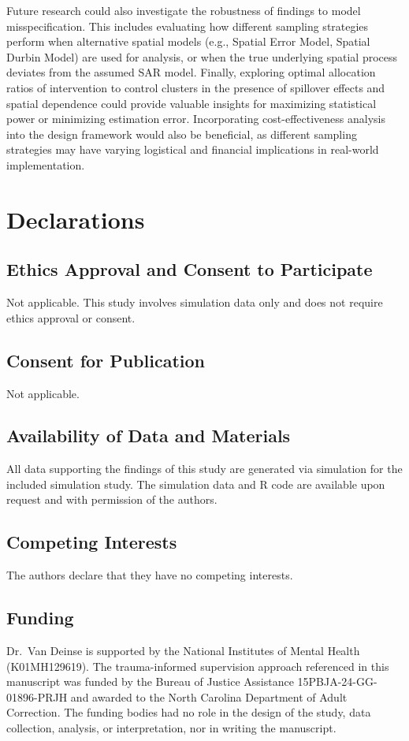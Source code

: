 \documentclass{article}[11pt]
\begin{document}
Future research could also investigate the robustness of findings to model
misspecification. This includes evaluating how different sampling strategies perform when
alternative spatial models (e.g., Spatial Error Model, Spatial Durbin Model) are used for
analysis, or when the true underlying spatial process deviates from the assumed SAR model. Finally, exploring optimal allocation ratios of intervention to control clusters in the presence of spillover effects and spatial dependence could provide valuable insights for maximizing statistical power or minimizing estimation error. Incorporating cost-effectiveness analysis into the design framework would also be beneficial, as different sampling strategies may have varying logistical and financial implications in real-world implementation.

\section*{Declarations}

\subsection*{Ethics Approval and Consent to Participate}
Not applicable. This study involves simulation data only and does not require ethics approval or consent.

\subsection*{Consent for Publication}
Not applicable.

\subsection*{Availability of Data and Materials}
All data supporting the findings of this study are generated via simulation for the included simulation study. The simulation data and R code are available upon request and with permission of the authors.

\subsection*{Competing Interests}
The authors declare that they have no competing interests.

\subsection*{Funding}
Dr.\ Van Deinse is supported by the National Institutes of Mental Health (K01MH129619). The trauma-informed supervision approach referenced in this manuscript was funded by the Bureau of Justice Assistance 15PBJA-24-GG-01896-PRJH and awarded to the North Carolina Department of Adult Correction. The funding bodies had no role in the design of the study, data collection, analysis, or interpretation, nor in writing the manuscript.
\end{document}

